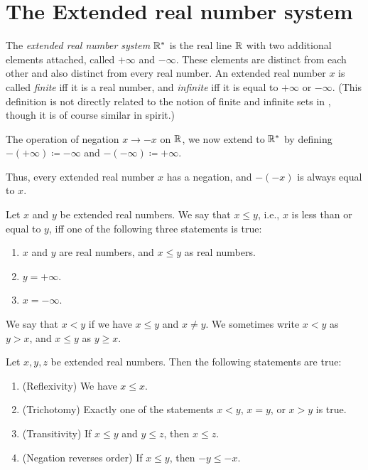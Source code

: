 \section{The Extended real number system}\label{i:sec:6.2}

\begin{defn}\label{i:6.2.1}
  The \emph{extended real number system \(\mathbb{R}^*\)} is the real line \(\mathbb{R}\) with two additional elements attached, called \(+\infty\) and \(-\infty\).
  These elements are distinct from each other and also distinct from every real number.
  An extended real number \(x\) is called \emph{finite} iff it is a real number, and \emph{infinite} iff it is equal to \(+\infty\) or \(-\infty\).
  (This definition is not directly related to the notion of finite and infinite sets in , though it is of course similar in spirit.)
\end{defn}

\begin{defn}\label{i:6.2.2}
  The operation of negation \(x \to -x\) on \(\mathbb{R}\), we now extend to \(\mathbb{R}^*\) by defining \(-(+\infty) \coloneqq -\infty\) and \(-(-\infty) \coloneqq +\infty\).
\end{defn}

\begin{note}
  Thus, every extended real number \(x\) has a negation, and \(-(-x)\) is always equal to \(x\).
\end{note}

\begin{defn}\label{i:6.2.3}
  Let \(x\) and \(y\) be extended real numbers.
  We say that \(x \leq y\), i.e., \(x\) is less than or equal to \(y\), iff one of the following three statements is true:
  \begin{enumerate}
    \item \(x\) and \(y\) are real numbers, and \(x \leq y\) as real numbers.
    \item \(y = +\infty\).
    \item \(x = -\infty\).
  \end{enumerate}
  We say that \(x < y\) if we have \(x \leq y\) and \(x \neq y\).
  We sometimes write \(x < y\) as \(y > x\), and \(x \leq y\) as \(y \geq x\).
\end{defn}

\setcounter{thm}{4}
\begin{prop}\label{i:6.2.5}
  Let \(x, y, z\) be extended real numbers.
  Then the following statements are true:
  \begin{enumerate}
    \item\label{i:6.2.5.a} (Reflexivity)
    We have \(x \leq x\).
    \item\label{i:6.2.5.b} (Trichotomy)
    Exactly one of the statements \(x < y\), \(x = y\), or \(x > y\) is true.
    \item\label{i:6.2.5.c} (Transitivity)
    If \(x \leq y\) and \(y \leq z\), then \(x \leq z\).
    \item\label{i:6.2.5.d} (Negation reverses order) If \(x \leq y\), then \(-y \leq -x\).
  \end{enumerate}
\end{prop}


